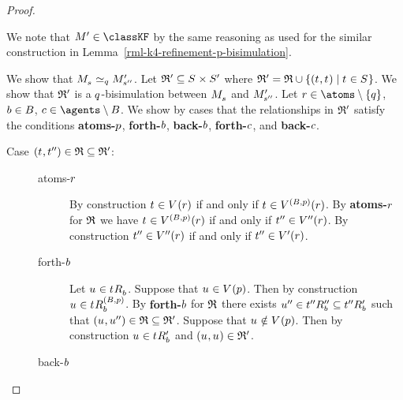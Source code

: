 \begin{proof}
\begin{description}
        We note that $\kModelP \in \classKF$ by the same reasoning as used for the similar construction in Lemma~\ref{rml-k4-refinement-p-bisimulation}.

        We show that $\kPModel{\kStateS} \bisimilar[\atomQ] \kPModelP{\kStateSPP}$.
        Let $\bisimulation' \subseteq \kStates \times \kStatesP$ where $\bisimulation' = \bisimulation \cup \{(\kStateT, \kStateT) \mid \kStateT \in \kStates\}$.
        We show that $\mathfrak{R}'$ is a $q$-bisimulation between $\kPModel{\kStateS}$ and ${M^{\prime}_{{s}^{\prime\prime}}}$.
        Let $\atomR \in \atoms \setminus \{\atomQ\}$, $b \in B$, $\agentC \in \agents \setminus \agentsB$.
        We show by cases that the relationships in $\mathfrak{R}'$ satisfy the conditions {\bf atoms-$p$}, {\bf forth-$b$}, {\bf back-$b$}, {\bf forth-$c$}, and {\bf back-$c$}.
        \begin{description}
            \item[{Case $(\kStateT, \kStateTPP) \in \bisimulation \subseteq \bisimulation'$:}]
                \hfill
                \begin{description}
                    \item[atoms-$r$] 
                        By construction $\kStateT \in \kValuation(\atomR)$ if and only if $\kStateT \in \kValuation[(\agentsB, \atomP)](\atomR)$.
                        By {\bf atoms-$r$} for $\mathfrak{R}$ we have $\kStateT \in \kValuation[(\agentsB, \atomP)](\atomR)$ if and only if ${t}^{\prime\prime} \in {V^{\prime\prime}}(r)$.
                        By construction ${t}^{\prime\prime} \in {V^{\prime\prime}}(r)$ if and only if ${t}^{\prime\prime} \in {V^{\prime}}(r)$.
                    \item[forth-$b$]
                        Let $\kStateU \in \kSuccessorsB{\kStateT}$.
                        Suppose that $\kStateU \in \kValuation(\atomP)$.
                        Then by construction $\kStateU \in \kSuccessorsB[(\agentsB, \atomP)]{\kStateT}$.
                        By {\bf forth-$b$} for $\mathfrak{R}$ there exists ${u}^{\prime\prime} \in {{t}^{\prime\prime}} {R^{\prime\prime}_{b}} \subseteq {{t}^{\prime\prime}} {R^{\prime}_{b}}$ such that $(\kStateU, \kStateUPP) \in \bisimulation \subseteq \bisimulation'$.
                        Suppose that $\kStateU \notin \kValuation(\atomP)$.
                        Then by construction $\kStateU \in \kSuccessorsPB{\kStateT}$ and $(\kStateU, \kStateU) \in \bisimulation'$.
                    \item[back-$b$]

\end{description}
\end{description}
\end{description}
\end{proof}
